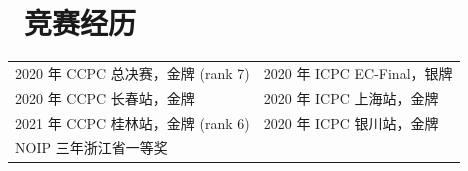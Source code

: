 \section{\faStar\ 竞赛经历}


\begin{tabular}{p{} p{}}
    2020 年 CCPC 总决赛，金牌 (rank 7) & 2020 年 ICPC EC-Final，银牌 \\
    2020 年 CCPC 长春站，金牌          & 2020 年 ICPC 上海站，金牌      \\
    2021 年 CCPC 桂林站，金牌 (rank 6) & 2020 年 ICPC 银川站，金牌      \\
    NOIP 三年浙江省一等奖               &                         \\
\end{tabular}
